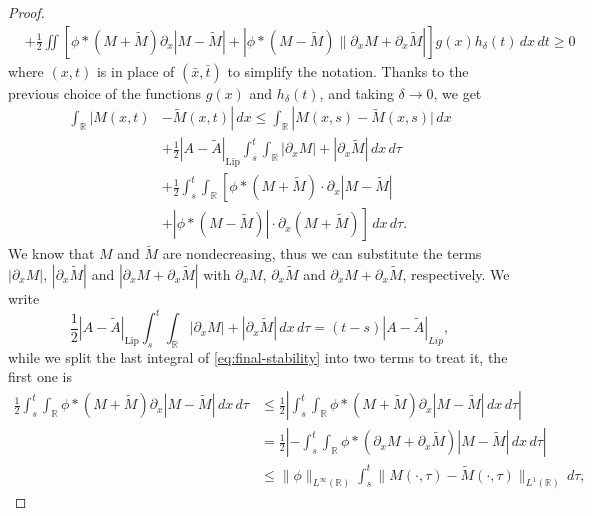 \documentclass[11pt,a4paper,oneside]{amsart}
\newcommand\R{\mathbb{R}}
\newcommand{\Lip}{\text{Lip}}
\begin{document}
\begin{proof}
\begin{align*}
            & + \frac{1}{2}\iint \left[ \phi\ast(M+\tilde M)\partial_x|M-\tilde M| + |\phi\ast (M-\tilde M)\|\partial_x M+\partial_x\tilde M|\right]g(x)h_\delta(t)\,dx\,dt \geq 0
        \end{align*}
        where $(x,t)$ is in place of $(\bar x,\bar t)$ to simplify the notation. Thanks to the previous choice of the functions $g(x)$ and $h_\delta(t)$,
        and taking $\delta\to0$, we get
        \begin{equation}
            \begin{aligned}
             \int_\R|M(x,t)&-\tilde M(x,t)|\,dx \leq \int_\R|M(x,s)-\tilde M(x,s)|\,dx\\
            & + \frac{1}{2}|A-\tilde A|_{\Lip}\int_s^t\int_\R |\partial_x M|+|\partial_x \tilde M|\,dx\,d\tau\\
            & + \frac{1}{2}\int_s^t\int_\R \left[ \phi\ast( M+\tilde M) \cdot \partial_x|M-\tilde M|\right.\\
            &\left.+ |\phi\ast(M-\tilde M)|\cdot \partial_x(M+\tilde M)\right]\,dx\,d\tau.
        \end{aligned}\label{eq:final-stability}
        \end{equation}
        We know that $M$ and $\tilde M$ are nondecreasing, thus we can substitute the terms $|\partial_x M|$, $|\partial_x \tilde M|$ 
        and $|\partial_x M+\partial_x \tilde M|$ with $\partial_x M$, $\partial_x \tilde M$ and $\partial_x M+\partial_x\tilde M$, respectively. We write
        $$
        \frac{1}{2}|A-\tilde A|_{\Lip}\int_s^t\int_\R |\partial_x M|+|\partial_x \tilde M|\,dx\,d\tau=(t-s)|A-\tilde A|_{Lip},
        $$
        while we split the last integral of \eqref{eq:final-stability} into two terms to treat it, 
        the first one is
        \begin{align*}
            \frac{1}{2} \int_s^t\int_\R \phi\ast(M+\tilde M)\partial_x|M-\tilde M|\,dx\,d\tau &\leq \frac{1}{2} \left| \int_s^t\int_\R \phi\ast(M+\tilde M)\partial_x|M-\tilde M|\,dx\,d\tau \right|\\
            & = \frac{1}{2} \left| -\int_s^t\int_\R \phi\ast(\partial_x M+\partial_x \tilde M)|M-\tilde M|\,dx\,d\tau \right| \\
            &\leq \|\phi\|_{L^\infty(\R)}\int_s^t\|M(\cdot,\tau)-\tilde M(\cdot,\tau)\|_{L^1(\R)}\,d\tau,
        \end{align*}

\end{proof}
\end{document}
